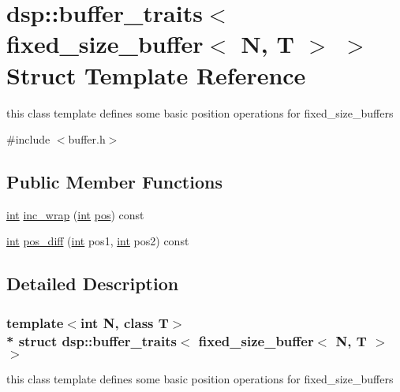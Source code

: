 \hypertarget{structdsp_1_1buffer__traits_3_01fixed__size__buffer_3_01_n_00_01_t_01_4_01_4}{}\section{dsp\+:\+:buffer\+\_\+traits$<$ fixed\+\_\+size\+\_\+buffer$<$ N, T $>$ $>$ Struct Template Reference}
\label{structdsp_1_1buffer__traits_3_01fixed__size__buffer_3_01_n_00_01_t_01_4_01_4}


this class template defines some basic position operations for fixed\+\_\+size\+\_\+buffers  




{\ttfamily \#include $<$buffer.\+h$>$}

\subsection*{Public Member Functions}
\begin{DoxyCompactItemize}
\item 
\hyperlink{tk_8h_a83f82f76e7fed06f4c49d2db94028a6d}{int} \hyperlink{structdsp_1_1buffer__traits_3_01fixed__size__buffer_3_01_n_00_01_t_01_4_01_4_a97df3fb46361a012761496cfda5f0e34}{inc\+\_\+wrap} (\hyperlink{tk_8h_a83f82f76e7fed06f4c49d2db94028a6d}{int} \hyperlink{wn_8c_a1910d262855b71da353ed0d07a6c7823}{pos}) const 
\item 
\hyperlink{tk_8h_a83f82f76e7fed06f4c49d2db94028a6d}{int} \hyperlink{structdsp_1_1buffer__traits_3_01fixed__size__buffer_3_01_n_00_01_t_01_4_01_4_ac3927f38474faf32fdd335e000ee2748}{pos\+\_\+diff} (\hyperlink{tk_8h_a83f82f76e7fed06f4c49d2db94028a6d}{int} pos1, \hyperlink{tk_8h_a83f82f76e7fed06f4c49d2db94028a6d}{int} pos2) const 
\end{DoxyCompactItemize}


\subsection{Detailed Description}
\subsubsection*{template$<$int N, class T$>$\\*
struct dsp\+::buffer\+\_\+traits$<$ fixed\+\_\+size\+\_\+buffer$<$ N, T $>$ $>$}

this class template defines some basic position operations for fixed\+\_\+size\+\_\+buffers 

